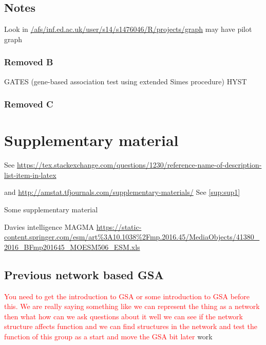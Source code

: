 

\subsection{Notes}

Look in \url{/afs/inf.ed.ac.uk/user/s14/s1476046/R/projects/graph} may have pilot graph

\subsubsection{Removed B}
GATES (gene-based association test using extended Simes procedure)\cite{li2011gates} HYST \cite{li2012hyst}

\subsubsection{Removed C}
\section{Supplementary material}
See \url{https://tex.stackexchange.com/questions/1230/reference-name-of-description-list-item-in-latex}

and \url{http://amstat.tfjournals.com/supplementary-materials/}
See \ref{sup:sup1}
\begin{description}
\label{sup:sup1}

\item{Some supplementary material}
\end{description}

Davies intelligence MAGMA \url{https://static-content.springer.com/esm/art\%3A10.1038\%2Fmp.2016.45/MediaObjects/41380_2016_BFmp201645_MOESM506_ESM.xls}


\subsection{Previous network based GSA}
\label{sec:previous network based GSA}
\textcolor{red}{You need to get the introduction to GSA or some introduction to GSA before this. We are really saying something like we can represent the thing as a network then what how can we ask questions about it well we can see if the network structure affects function and we can find structures in the network and test the function of this group as a start and move the GSA bit later}
work


